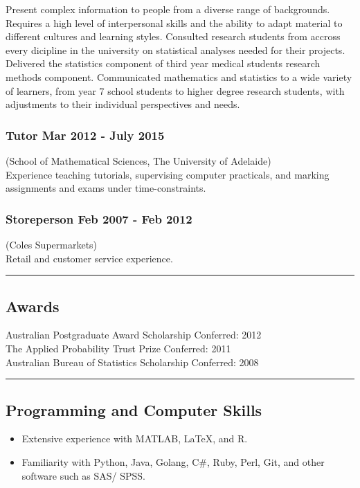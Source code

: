 \documentclass[a4paper,12pt]{report}
\begin{document}
Present complex information to people from a diverse range of backgrounds. Requires a high level of interpersonal skills and the ability to adapt material to different cultures and learning styles. Consulted research students from accross every dicipline in the university on statistical analyses needed for their projects. Delivered the statistics component of third year medical students research methods component. Communicated mathematics and statistics to a wide variety of learners, from year 7 school students to higher degree research students, with adjustments to their individual perspectives and needs.

\subsubsection*{Tutor \hfill Mar 2012 - July 2015} \vspace{-6pt}
(School of Mathematical Sciences, The University of Adelaide) \\[4pt]

Experience teaching tutorials, supervising computer practicals, and marking assignments and exams under time-constraints.

\subsubsection*{Storeperson \hfill Feb 2007 - Feb 2012} \vspace{-6pt}
(Coles Supermarkets) \\[4pt]

Retail and customer service experience.


\vspace{1cm}
\hrule

\subsection*{Awards}
Australian Postgraduate Award Scholarship \hfill Conferred: 2012 \\ 
The Applied Probability Trust Prize \hfill Conferred: 2011 \\
Australian Bureau of Statistics Scholarship \hfill Conferred: 2008 \\

\hrule

\subsection*{Programming and Computer Skills}          
\begin{itemize}
	\item Extensive experience with MATLAB, \LaTeX, and R.
	\item Familiarity with Python, Java, Golang, C\#, Ruby, Perl, Git, and other software such as SAS/ SPSS. 
\end{itemize}
\end{document}

